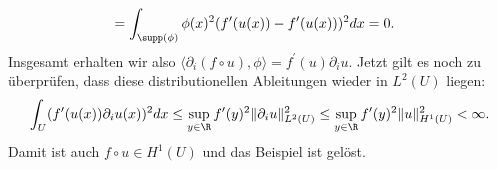 \begin{solution}
\begin{align*}
  &= \int_{\supp(\phi)}\phi(x)^2(f^{\prime}(u(x)) - f^{\prime}(u(x)))^2 dx = 0.
\end{align*}
Insgesamt erhalten wir also $\langle \partial_i (f \circ u), \phi \rangle = f^{\prime}(u)\partial_i u$.
Jetzt gilt es noch zu überprüfen, dass diese distributionellen Ableitungen wieder
in $L^2(U)$ liegen:
\begin{align*}
  \int_{U}(f^{\prime}(u(x))\partial_i u(x))^2 dx
  \leq \sup_{y \in \R}f^{\prime}(y)^2\|\partial_i u\|_{L^2(U)}^2
  \leq \sup_{y \in \R}f^{\prime}(y)^2\|u\|_{H^1(U)}^2 < \infty.
\end{align*}
Damit ist auch $f \circ u \in H^1(U)$ und das Beispiel ist gelöst.
\end{solution}

